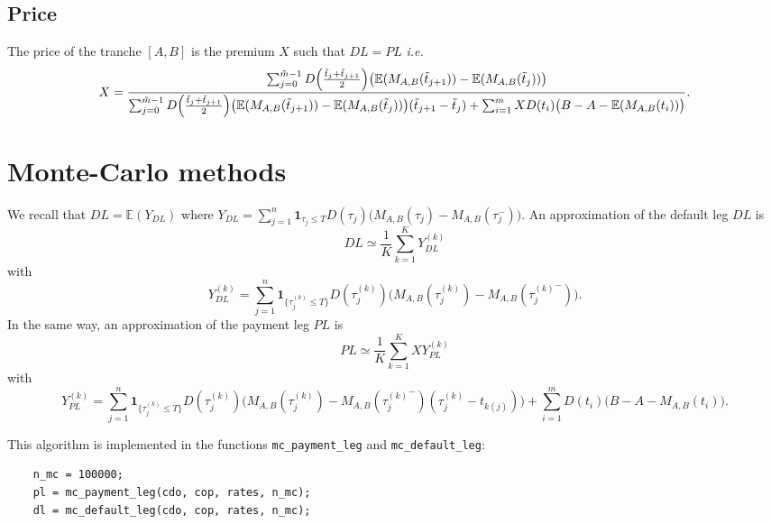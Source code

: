 \documentclass[10pt, a4paper]{article}
\newcommand{\code}[1]{{\upshape \lstinline[language=c]{#1}}}
\newcommand{\E}{\mathbb{E}}
\begin{document}
\subsection{Price}
The price of the tranche $[A,B]$ is the premium $X$ such that $DL = PL$ \emph{i.e.} 
\begin{equation*}
    X = \frac{\sum_{j=0}^{\tilde{m}-1} D\Bigl( \frac{\tilde{t}_j + \tilde{t}_{j+1}}{2} \Bigr) \bigl(\E(M_{A,B}(\tilde{t}_{j+1})) - \E(M_{A,B}(\tilde{t}_j))\bigr)}{\sum_{j=0}^{\tilde{m}-1} D\Bigl( \frac{\tilde{t}_j + \tilde{t}_{j+1}}{2} \Bigr) \bigl(\E(M_{A,B}(\tilde{t}_{j+1})) - \E(M_{A,B}(\tilde{t}_j))\bigr) (\tilde{t}_{j+1} - \tilde{t}_j) + \sum_{i=1}^m X D(t_i) \bigl(B-A-\E(M_{A,B}(t_i))\bigr)}.
\end{equation*}

\section{Monte-Carlo methods}
We recall that $DL = \E(Y_{DL})$ where $Y_{DL} = \sum_{j=1}^n \mathbf{1}_{\tau_j \le T} D(\tau_j) \bigl(M_{A,B}(\tau_j) - M_{A,B}(\tau_j^-) \bigr)$.
An approximation of the default leg $DL$ is 
\begin{equation*}
    DL \simeq \frac{1}{K} \sum_{k=1}^K Y_{DL}^{(k)}
\end{equation*}
with
\begin{equation*}
    Y_{DL}^{(k)} = \sum_{j=1}^n \mathbf{1}_{\{\tau_j^{(k)} \le T\}} D(\tau_j^{(k)}) \bigl(M_{A,B}(\tau_j^{(k)}) - M_{A,B}({\tau_j^{(k)}}^-) \bigr).
\end{equation*}
In the same way, an approximation of the payment leg $PL$ is 
\begin{equation*}
    PL \simeq \frac{1}{K} \sum_{k=1}^K X Y_{PL}^{(k)}
\end{equation*}
with
\begin{equation*}
    Y_{PL}^{(k)} = \sum_{j=1}^n \mathbf{1}_{\{\tau_j^{(k)} \le T\}} D(\tau_j^{(k)}) \bigl(M_{A,B}(\tau_j^{(k)}) - M_{A,B}({\tau_j^{(k)}}^-) (\tau_j^{(k)} - t_{k(j)})\bigr) + \sum_{i=1}^m D(t_i) \bigl(B-A-M_{A,B}(t_i)\bigr).
\end{equation*}

This algorithm is implemented in the functions \code{mc_payment_leg} and \code{mc_default_leg}: 
\begin{lstlisting}
    n_mc = 100000; 
    pl = mc_payment_leg(cdo, cop, rates, n_mc);
    dl = mc_default_leg(cdo, cop, rates, n_mc);
\end{lstlisting}
\end{document}
